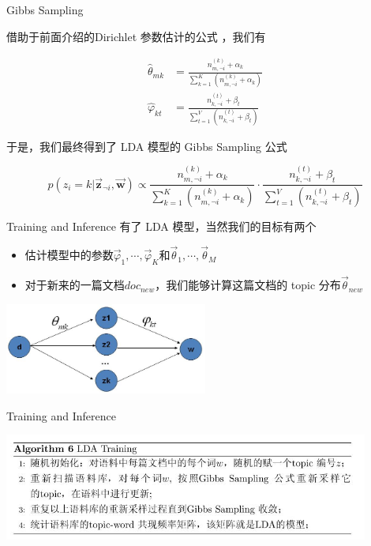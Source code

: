 \documentclass{beamer}
\begin{document}
\begin{CJK*}{UTF8}{gbsn}
\begin{frame}{Gibbs Sampling}
\begin{small}
借助于前面介绍的Dirichlet 参数估计的公式 ，我们有

\begin{align*}
\hat{\theta}_{mk} &= \frac{n_{m,\neg i}^{(k)} + \alpha_k}{\sum_{k=1}^K (n_{m,\neg i}^{(k)} + \alpha_k)} \\
\hat{\varphi}_{kt} &= \frac{n_{k,\neg i}^{(t)} + \beta_t}{\sum_{t=1}^V (n_{k,\neg i}^{(t)} + \beta_t)}
\end{align*}

于是，我们最终得到了 LDA 模型的 Gibbs Sampling 公式

\[
\label{gibbs-sampling}
p(z_i = k|\overrightarrow{\mathbf{z}}_{\neg i}, \overrightarrow{\mathbf{w}}) \propto
\frac{n_{m,\neg i}^{(k)} + \alpha_k}{\sum_{k=1}^K (n_{m,\neg i}^{(k)} + \alpha_k)}
\cdot \frac{n_{k,\neg i}^{(t)} + \beta_t}{\sum_{t=1}^V (n_{k,\neg i}^{(t)} + \beta_t)}
\]
\end{small}
\end{frame}

\begin{frame}{Training and Inference}
有了 LDA 模型，当然我们的目标有两个
\begin{itemize}
\item 估计模型中的参数$\overrightarrow{\varphi}_1, \cdots, \overrightarrow{\varphi}_K$和$\overrightarrow{\theta}_1, \cdots, \overrightarrow{\theta}_M$
\item 对于新来的一篇文档$doc_{new}$，我们能够计算这篇文档的 topic 分布$\overrightarrow{\theta}_{new}$
\end{itemize}
\begin{center}
	\includegraphics[width=0.5\textwidth]{picture/doc2.jpg}
\end{center}
\end{frame}


\begin{frame}{Training and Inference}

\begin{center}
	\includegraphics[width=0.9\textwidth]{picture/T.jpeg}
\end{center}


\end{frame}
\end{CJK*}
\end{document}
